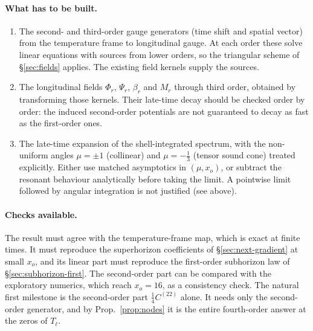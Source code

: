 \paragraph{What has to be built.}
\begin{enumerate}
\item The second- and third-order gauge generators (time shift and spatial vector) from the
  temperature frame to longitudinal gauge. At each order these solve linear equations with
  sources from lower orders, so the triangular scheme of \S\ref{sec:fields} applies. The
  existing field kernels supply the sources.
\item The longitudinal fields $\Phi_r$, $\Psi_r$, $\beta_r$ and $M_r$ through third order,
  obtained by transforming those kernels. Their late-time decay should be checked order by
  order: the induced second-order potentials are not guaranteed to decay as fast as the
  first-order ones.
\item The late-time expansion of the shell-integrated spectrum, with the non-uniform angles
  $\mu=\pm1$ (collinear) and $\mu=-\frac13$ (tensor sound cone) treated explicitly. Either
  use matched asymptotics in $(\mu,x_o)$, or subtract the resonant behaviour analytically
  before taking the limit. A pointwise limit followed by angular integration is not
  justified (see above).
\end{enumerate}

\paragraph{Checks available.} The result must agree with the temperature-frame map, which
is exact at finite times. It must reproduce the superhorizon coefficients of
\S\ref{sec:next-gradient} at small $x_o$, and its linear part must reproduce the first-order
subhorizon law of \S\ref{sec:subhorizon-first}. The second-order part can be
compared with the exploratory numerics, which reach $x_o=16$, as a consistency check. The
natural first milestone is the second-order part $\frac14C^{(22)}$ alone. It needs only the
second-order generator, and by Prop.~\ref{prop:nodes} it is the entire fourth-order answer at
the zeros of $T_\ell$.

